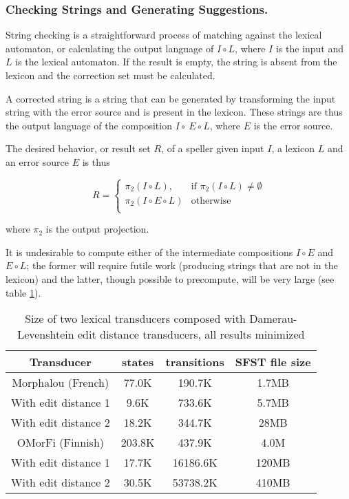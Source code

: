 \documentclass{llncs}
\begin{document}
\subsubsection{Checking Strings and Generating Suggestions.}

String checking is a straightforward process of matching against the lexical
automaton, or calculating the output language of $I \circ L$, where $I$ is the
input and $L$ is the lexical automaton. If the result is empty, the
string is absent from the lexicon and the correction set must be calculated.

A corrected string is a string that can be generated by transforming the
input string with the error source and is present in the lexicon.
These strings are thus the output language of the composition
$I \circ \ E \circ L$, where $E$ is the error source.

The desired behavior, or result set $R$, of a speller given input $I$, a
lexicon $L$ and an error source $E$ is thus

\begin{equation*}R = \begin{cases}
    \pi_2(I \circ L), & \mbox{if } \pi_2(I \circ L) \neq \emptyset \\
    \pi_2(I \circ E \circ L) & \mbox{otherwise}\\
  \end{cases}
\end{equation*}

where $\pi_2$ is the output projection.

It is undesirable to compute either of the intermediate compositions
$I \circ E$ and $E \circ L$; the former will require futile work (producing
strings that are not in the lexicon) and the latter, though possible to
precompute, will be very large (see table \ref{composed_error_table}).

\begin{table}
  \centering
  \caption{Size of two lexical transducers composed with
    Damerau-Levenshtein edit distance transducers, all results minimized}
  \label{composed_error_table}
  \begin{tabular}{ |c| c c c| }
    \hline
    Transducer               & states   & transitions & SFST file size \\ \hline
    Morphalou (French)       & 77.0K    & 190.7K   & 1.7MB \\
    With edit distance 1     & 9.6K     & 733.6K   & 5.7MB \\
    With edit distance 2     & 18.2K    & 344.7K  & 28MB \\ \hline
    OMorFi (Finnish)         & 203.8K   & 437.9K   & 4.0M \\
    With edit distance 1     & 17.7K    & 16186.6K & 120MB \\
    With edit distance 2     & 30.5K    & 53738.2K & 410MB \\ \hline
  \end{tabular}

\end{table}
\end{document}

